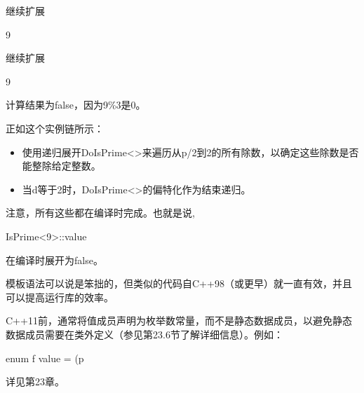 继续扩展

\begin{cpp}
9%
\end{cpp}

继续扩展

\begin{cpp}
9%
\end{cpp}

计算结果为false，因为9\%3是0。

正如这个实例链所示：

\begin{itemize}
\item 
使用递归展开DoIsPrime<>来遍历从p/2到2的所有除数，以确定这些除数是否能整除给定整数。

\item 
当d等于2时，DoIsPrime<>的偏特化作为结束递归。
\end{itemize}

注意，所有这些都在编译时完成。也就是说,

\begin{cpp}
IsPrime<9>::value
\end{cpp}

在编译时展开为false。

模板语法可以说是笨拙的，但类似的代码自C++98（或更早）就一直有效，并且可以提高运行库的效率。

\begin{notice}
C++11前，通常将值成员声明为枚举数常量，而不是静态数据成员，以避免静态数据成员需要在类外定义（参见第23.6节了解详细信息）。例如：
\begin{cpp}
enum f value = (p%
\end{cpp}
\end{notice}

详见第23章。


























